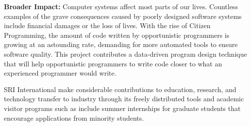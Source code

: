 \medskip\noindent
{\bf{Broader Impact:}}
Computer systems affect most parts of our lives. Countless examples of 
the grave consequences caused by poorly designed software systems include 
financial damages or the loss of lives. With the rise of Citizen Programming, 
the amount of code written by opportunistic programmers is growing at an 
astounding rate, demanding for more automated tools to ensure software quality. 
This project contributes a data-driven program design technique that will help 
opportunistic programmers to write code closer to what an experienced programmer 
would write. 

SRI International make considerable contributions to education, research, 
and technology transfer to industry through its freely distributed tools 
and academic visitor programs such as include summer internships for graduate 
students that encourage applications from minority students. 
